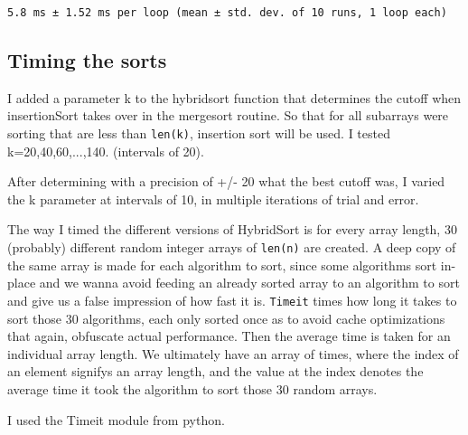 \documentclass[11pt]{article}
\begin{document}
    \begin{Verbatim}[commandchars=\\\{\}]
5.8 ms ± 1.52 ms per loop (mean ± std. dev. of 10 runs, 1 loop each)

    \end{Verbatim}

    \subsection{Timing the sorts}\label{timing-the-sorts}

I added a parameter k to the hybridsort function that determines the
cutoff when insertionSort takes over in the mergesort routine. So that
for all subarrays were sorting that are less than \texttt{len(k)},
insertion sort will be used. I tested k=20,40,60,...,140. (intervals of
20).

After determining with a precision of +/- 20 what the best cutoff was, I
varied the k parameter at intervals of 10, in multiple iterations of
trial and error.

The way I timed the different versions of HybridSort is for every array
length, 30 (probably) different random integer arrays of \texttt{len(n)}
are created. A deep copy of the same array is made for each algorithm to
sort, since some algorithms sort in-place and we wanna avoid feeding an
already sorted array to an algorithm to sort and give us a false
impression of how fast it is. \texttt{Timeit} times how long it takes to
sort those 30 algorithms, each only sorted once as to avoid cache
optimizations that again, obfuscate actual performance. Then the average
time is taken for an individual array length. We ultimately have an
array of times, where the index of an element signifys an array length,
and the value at the index denotes the average time it took the
algorithm to sort those 30 random arrays.

I used the Timeit module from python.
\end{document}
